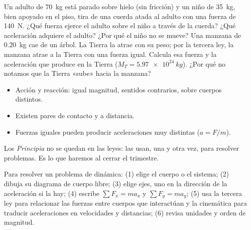 \documentclass[11pt]{article}
\begin{document}
\begin{preguntas}
\pregunta Un adulto de \qty{70}{kg} está parado sobre hielo (sin fricción) y un niño de
\qty{35}{kg}, bien apoyado en el piso, tira de una cuerda atada al adulto con una fuerza de
\qty{140}{N}. ¿Qué fuerza ejerce el adulto sobre el niño a través de la cuerda? ¿Qué
aceleración adquiere el adulto? ¿Por qué el niño no se mueve?
\espacio{3.5cm}
\pregunta Una manzana de \qty{0,20}{kg} cae de un árbol. La Tierra la atrae con su peso; por la
tercera ley, la manzana atrae a la Tierra con una fuerza igual. Calcula esa fuerza y la
aceleración que produce en la Tierra ($M_T = \qty{5,97e24}{kg}$). ¿Por qué no notamos que la
Tierra «sube» hacia la manzana?
\espacio{3.5cm}
\end{preguntas}

\begin{resumen}
\begin{itemize}
  \item Acción y reacción: igual magnitud, sentidos contrarios, sobre cuerpos distintos.
  \item Existen pares de contacto y a distancia.
  \item Fuerzas iguales pueden producir aceleraciones muy distintas ($a = F/m$).
\end{itemize}
\end{resumen}

\label{tema:tresleyes}

\begin{hilo}
Los \emph{Principia} no se quedan en las leyes: las usan, una y otra vez, para resolver
problemas. Es lo que haremos al cerrar el trimestre.
\end{hilo}

Para resolver un problema de dinámica: (1) elige el cuerpo o el sistema; (2) dibuja su
diagrama de cuerpo libre; (3) elige ejes, uno en la dirección de la aceleración si la hay;
(4) escribe $\sum F_x = m a_x$ y $\sum F_y = m a_y$; (5) usa la tercera ley para relacionar
las fuerzas entre cuerpos que interactúan y la cinemática para traducir aceleraciones en
velocidades y distancias; (6) revisa unidades y orden de magnitud.
\end{document}
